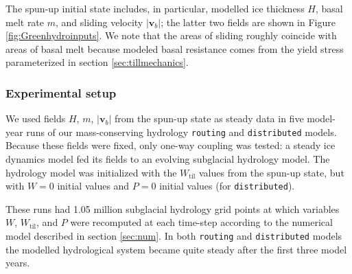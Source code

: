 \documentclass[gmd]{copernicus}   %
\newcommand{\text}{\textrm}
\newcommand\bv{\mathbf{v}}
\newcommand{\Wtil}{W_{\text{til}}}
\begin{document}
The spun-up initial state includes, in particular, modelled ice thickness $H$, basal melt rate $m$, and sliding velocity $|\bv_b|$; the latter two fields are shown in Figure \ref{fig:Greenhydroinputs}.  We note that the areas of sliding roughly coincide with areas of basal melt because modeled basal resistance comes from the yield stress parameterized in section \ref{sec:tillmechanics}.

\subsubsection{Experimental setup}  We used fields $H$, $m$, $|\bv_b|$ from the spun-up state as steady data in five model-year runs of our mass-conserving hydrology \texttt{routing} and \texttt{distributed} models.  Because these fields were fixed, only one-way coupling was tested: a steady ice dynamics model fed its fields to an evolving subglacial hydrology model.  The hydrology model was initialized with the $\Wtil$ values from the spun-up state, but with $W=0$ initial values and $P=0$ initial values (for \texttt{distributed}).

These runs had 1.05 million subglacial hydrology grid points at which variables $W$, $\Wtil$, and $P$ were recomputed at each time-step according to the numerical model described in section \ref{sec:num}.  In both \texttt{routing} and \texttt{distributed} models the modelled hydrological system became quite steady after the first three model years.
\end{document}
